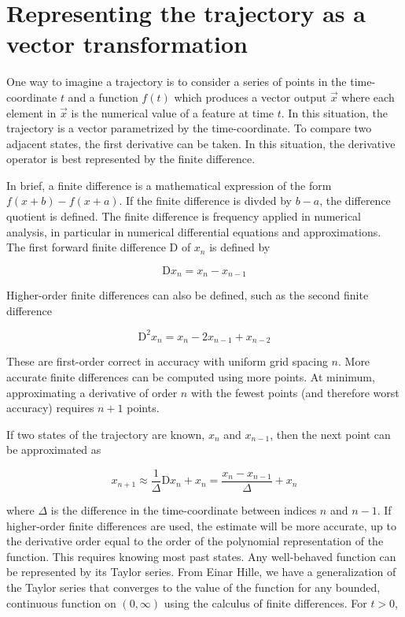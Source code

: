 \documentclass[]{article}
\begin{document}
\section{Representing the trajectory as a vector transformation}

One way to imagine a trajectory is to consider a series of points in the time-coordinate $t$ and a function $f(t)$ which produces a vector output $\vec{x}$ where each element in $\vec{x}$ is the numerical value of a feature at time $t$. In this situation, the trajectory is a vector parametrized by the time-coordinate. To compare two adjacent states, the first derivative can be taken. In this situation, the derivative operator is best represented by the finite difference.

In brief, a finite difference is a mathematical expression of the form $f(x + b) - f(x + a)$. If the finite difference is divded by $b-a$, the difference quotient is defined. The finite difference is frequency applied in numerical analysis, in particular in numerical differential equations and approximations. The first forward finite difference $\mathrm{D}$ of $x_n$ is defined by

\begin{equation}
	\mathrm{D}x_n = x_n - x_{n-1}
\end{equation}

Higher-order finite differences can also be defined, such as the second finite difference

\begin{equation}
	\mathrm{D}^2 x_n = x_n - 2 x_{n-1} + x_{n-2}
\end{equation}

These are first-order correct in accuracy with uniform grid spacing $n$. More accurate finite differences can be computed using more points. At minimum, approximating a derivative of order $n$ with the fewest points (and therefore worst accuracy) requires $n+1$ points.

If two states of the trajectory are known, $x_n$ and $x_{n-1}$, then the next point can be approximated as

\begin{equation}
	x_{n+1} \approx \frac{1}{\Delta} \mathrm{D}x_n + x_n = \frac{x_n - x_{n-1}}{\Delta} + x_n
\end{equation}

where $\Delta$ is the difference in the time-coordinate between indices $n$ and $n-1$. If higher-order finite differences are used, the estimate will be more accurate, up to the derivative order equal to the order of the polynomial representation of the function. This requires knowing most past states. Any well-behaved function can be represented by its Taylor series. From Einar Hille, we have a generalization of the Taylor series that converges to the value of the function for any bounded, continuous function on $(0, \infty)$ using the calculus of finite differences. For $t > 0$,
\end{document}
